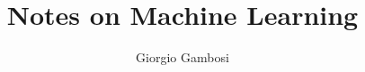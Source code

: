 

\title{Notes on Machine Learning}
\author{Giorgio Gambosi}

\newcommand{\includechapter}[1]{}
\newcommand{\includeonlychapter}[1]{}

\graphicspath{{./figs/}{./figs1/}{./figures/}}
\includeonlychapter{5-linregr-short.tex}



\maketitle
\includechapter{1-foundations-short.tex}
\includechapter{2-slt-short.tex}
\includechapter{3-training-short.tex}
\includechapter{4-probabilistic-learning-short.tex}
\includechapter{5-linregr-short.tex}
\includechapter{6-nonparam-regr-short.tex}
\includechapter{7-linclass-short.tex}
\includechapter{8-probclass-gen-short.tex}

\clearpage
\pagestyle{empty}
